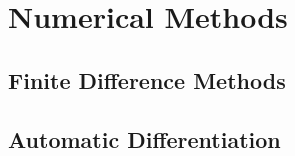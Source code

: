 \chapter{Numerical Methods}
\section{Finite Difference Methods}
\section{Automatic Differentiation}
